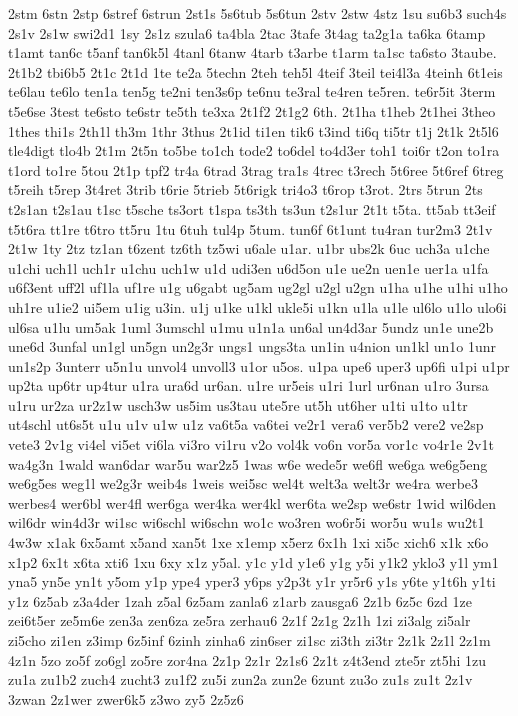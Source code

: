 {2stm
6stn
2stp
6stref
6strun
2st1s
5s6tub
5s6tun
2stv
2stw
4stz
1su
su6b3
such4s
2s1v
2s1w
swi2d1
1sy
2s1z
szula6
ta4bla
2tac
3tafe
3t4ag
ta2g1a
ta6ka
6tamp
t1amt
tan6c
t5anf
tan6k5l
4tanl
6tanw
4tarb
t3arbe
t1arm
ta1sc
ta6sto
3taube.
2t1b2
tbi6b5
2t1c
2t1d
1te
te2a
5techn
2teh
teh5l
4teif
3teil
tei4l3a
4teinh
6t1eis
te6lau
te6lo
ten1a
ten5g
te2ni
ten3s6p
te6nu
te3ral
te4ren
te5ren.
te6r5it
3term
t5e6se
3test
te6sto
te6str
te5th
te3xa
2t1f2
2t1g2
6th.
2t1ha
t1heb
2t1hei
3theo
1thes
thi1s
2th1l
th3m
1thr
3thus
2t1id
ti1en
tik6
t3ind
ti6q
ti5tr
t1j
2t1k
2t5l6
tle4digt
tlo4b
2t1m
2t5n
to5be
to1ch
tode2
to6del
to4d3er
toh1
toi6r
t2on
to1ra
t1ord
to1re
5tou
2t1p
tpf2
tr4a
6trad
3trag
tra1s
4trec
t3rech
5t6ree
5t6ref
6treg
t5reih
t5rep
3t4ret
3trib
t6rie
5trieb
5t6rigk
tri4o3
t6rop
t3rot.
2trs
5trun
2ts
t2s1an
t2s1au
t1sc
t5sche
ts3ort
t1spa
ts3th
ts3un
t2s1ur
2t1t
t5ta.
tt5ab
tt3eif
t5t6ra
tt1re
t6tro
tt5ru
1tu
6tuh
tul4p
5tum.
tun6f
6t1unt
tu4ran
tur2m3
2t1v
2t1w
1ty
2tz
tz1an
t6zent
tz6th
tz5wi
u6ale
u1ar.
u1br
ubs2k
6uc
uch3a
u1che
u1chi
uch1l
uch1r
u1chu
uch1w
u1d
udi3en
u6d5on
u1e
ue2n
uen1e
uer1a
u1fa
u6f3ent
uff2l
uf1la
uf1re
u1g
u6gabt
ug5am
ug2gl
u2gl
u2gn
u1ha
u1he
u1hi
u1ho
uh1re
u1ie2
ui5em
u1ig
u3in.
u1j
u1ke
u1kl
ukle5i
u1kn
u1la
u1le
ul6lo
u1lo
ulo6i
ul6sa
u1lu
um5ak
1uml
3umschl
u1mu
u1n1a
un6al
un4d3ar
5undz
un1e
une2b
une6d
3unfal
un1gl
un5gn
un2g3r
ungs1
ungs3ta
un1in
u4nion
un1kl
un1o
1unr
un1s2p
3unterr
u5n1u
unvol4
unvoll3
u1or
u5os.
u1pa
upe6
uper3
up6fi
u1pi
u1pr
up2ta
up6tr
up4tur
u1ra
ura6d
ur6an.
u1re
ur5eis
u1ri
1url
ur6nan
u1ro
3ursa
u1ru
ur2za
ur2z1w
usch3w
us5im
us3tau
ute5re
ut5h
ut6her
u1ti
u1to
u1tr
ut4schl
ut6s5t
u1u
u1v
u1w
u1z
va6t5a
va6tei
ve2r1
vera6
ver5b2
vere2
ve2sp
vete3
2v1g
vi4el
vi5et
vi6la
vi3ro
vi1ru
v2o
vol4k
vo6n
vor5a
vor1c
vo4r1e
2v1t
wa4g3n
1wald
wan6dar
war5u
war2z5
1was
w6e
wede5r
we6fl
we6ga
we6g5eng
we6g5es
weg1l
we2g3r
weib4s
1weis
wei5sc
wel4t
welt3a
welt3r
we4ra
werbe3
werbes4
wer6bl
wer4fl
wer6ga
wer4ka
wer4kl
wer6ta
we2sp
we6str
1wid
wil6den
wil6dr
win4d3r
wi1sc
wi6schl
wi6schn
wo1c
wo3ren
wo6r5i
wor5u
wu1s
wu2t1
4w3w
x1ak
6x5amt
x5and
xan5t
1xe
x1emp
x5erz
6x1h
1xi
xi5c
xich6
x1k
x6o
x1p2
6x1t
x6ta
xti6
1xu
6xy
x1z
y5al.
y1c
y1d
y1e6
y1g
y5i
y1k2
yklo3
y1l
ym1
yna5
yn5e
yn1t
y5om
y1p
ype4
yper3
y6ps
y2p3t
y1r
yr5r6
y1s
y6te
y1t6h
y1ti
y1z
6z5ab
z3a4der
1zah
z5al
6z5am
zanla6
z1arb
zausga6
2z1b
6z5c
6zd
1ze
zei6t5er
ze5m6e
zen3a
zen6za
ze5ra
zerhau6
2z1f
2z1g
2z1h
1zi
zi3alg
zi5alr
zi5cho
zi1en
z3imp
6z5inf
6zinh
zinha6
zin6ser
zi1sc
zi3th
zi3tr
2z1k
2z1l
2z1m
4z1n
5zo
zo5f
zo6gl
zo5re
zor4na
2z1p
2z1r
2z1s6
2z1t
z4t3end
zte5r
zt5hi
1zu
zu1a
zu1b2
zuch4
zucht3
zu1f2
zu5i
zun2a
zun2e
6zunt
zu3o
zu1s
zu1t
2z1v
3zwan
2z1wer
zwer6k5
z3wo
zy5
2z5z6}

